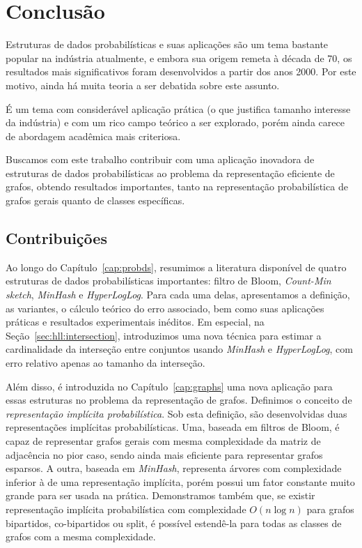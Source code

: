 \chapter{Conclusão}\label{cap:conclusion}

Estruturas de dados probabilísticas e suas aplicações são um tema bastante popular na indústria atualmente, e embora sua origem remeta à década de 70, os resultados mais significativos foram desenvolvidos a partir dos anos 2000. Por este motivo, ainda há muita teoria a ser debatida sobre este assunto.

É um tema com considerável aplicação prática (o que justifica tamanho interesse da indústria) e com um rico campo teórico a ser explorado, porém ainda carece de abordagem acadêmica mais criteriosa.

Buscamos com este trabalho contribuir com uma aplicação inovadora de estruturas de dados probabilísticas ao problema da representação eficiente de grafos, obtendo resultados importantes, tanto na representação probabilística de grafos gerais quanto de classes específicas.

\section{Contribuições}

Ao longo do Capítulo~\ref{cap:probds}, resumimos a literatura disponível de quatro estruturas de dados probabilísticas importantes: filtro de Bloom, \emph{Count-Min sketch}, \emph{MinHash} e \emph{HyperLogLog}. Para cada uma delas, apresentamos a definição, as variantes, o cálculo teórico do erro associado, bem como suas aplicações práticas e resultados experimentais inéditos. Em especial, na Seção~\ref{sec:hll:intersection}, introduzimos uma nova técnica para estimar a cardinalidade da interseção entre conjuntos usando \emph{MinHash} e \emph{HyperLogLog}, com erro relativo apenas ao tamanho da interseção.

Além disso, é introduzida no Capítulo~\ref{cap:graphs} uma nova aplicação para essas estruturas no problema da representação de grafos. Definimos o conceito de \emph{representação implícita probabilística}. Sob esta definição, são desenvolvidas duas representações implícitas probabilísticas. Uma, baseada em filtros de Bloom, é capaz de representar grafos gerais com mesma complexidade da matriz de adjacência no pior caso, sendo ainda mais eficiente para representar grafos esparsos. A outra, baseada em \emph{MinHash}, representa árvores com complexidade inferior à de uma representação implícita, porém possui um fator constante muito grande para ser usada na prática. Demonstramos também que, se existir representação implícita probabilística com complexidade $O(n \log n)$ para grafos bipartidos, co-bipartidos ou split, é possível estendê-la para todas as classes de grafos com a mesma complexidade.

